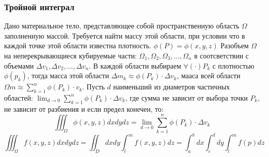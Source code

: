 \subsubsection{Тройной интеграл}
\begin{definition}
    Дано материальное тело, представляющее собой пространственную область $\Omega$ заполненную массой. Требуется найти массу этой области, при условии что в каждой точке этой области известна плотность. $\phi(P) = \phi(x,y,z)$
    Разобъем $\Omega$ на неперекрывающиеся кубируемые части: $\Omega_1, \Omega_2, \Omega_3, ... , \Omega_n$ в соотсветствии с объемами $\Delta v_1, \Delta v_2, ... , \Delta v_n$. В каждой области выбираем $\forall (\cdot) P_k $ с плотностью $\phi(p_k)$, тогда масса этой области $\Delta m_k \approx \phi(P_k) \cdot \Delta v_k$, мааса всей области $\Omega m \approx \sum_{k=1}^{n} \phi(P_k) \cdot v_k$. Пусть $d$ наименьший из диаметров частичных областей: $\lim_{d\rightarrow 0} \sum_{k=1}^{n} \phi(P_k) \cdot \Delta v_k$, где сумма не зависит от выбора точки $P_k$, не зависит от разбиения и если предел конечен, то:
    $$
        \iiint_{\Omega} \phi(x,y,z) dxdydz = \lim_{d \rightarrow 0} \sum_{k=1}^n \phi(P_k) \cdot \Delta v_k
    $$
    $$
        \iiint_\Omega f(x,y,z) dxdydz = \iint_D dxdy \int_l^m f(x,y,z ) dz = \int_a^b dx \int^d_c dy \int^m_l f(p) dz 
    $$
\end{definition}


